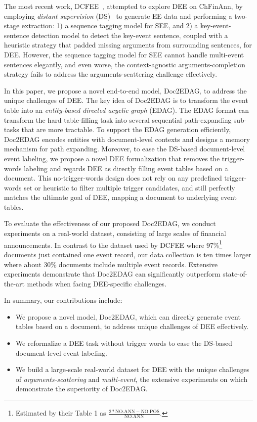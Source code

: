 \documentclass[11pt,a4paper]{article}
\begin{document}
The most recent work, DCFEE~\cite{yang2018dcfee}, attempted to explore DEE on ChFinAnn, by employing \textit{distant supervision} (DS)~\cite{mintz2009distant} to generate EE data and performing a two-stage extraction: 1) a sequence tagging model for SEE, and 2) a key-event-sentence detection model to detect the key-event sentence, coupled with a heuristic strategy that padded missing arguments from surrounding sentences, for DEE.
However, the sequence tagging model for SEE cannot handle multi-event sentences elegantly, and even worse, the context-agnostic arguments-completion strategy fails to address the arguments-scattering challenge effectively.

In this paper, we propose a novel end-to-end model, Doc2EDAG, to address the unique challenges of DEE.
The key idea of Doc2EDAG is to transform the event table into an \textit{entity-based directed acyclic graph} (EDAG).
The EDAG format can transform the hard table-filling task into several sequential path-expanding sub-tasks that are more tractable.
To support the EDAG generation efficiently, Doc2EDAG encodes entities with document-level contexts and designs a memory mechanism for path expanding.
Moreover, to ease the DS-based document-level event labeling,
we propose a novel DEE formalization that removes the trigger-words labeling and regards DEE as directly filling event tables based on a document.
This no-trigger-words design does not rely on any predefined trigger-words set or heuristic to filter multiple trigger candidates, and still perfectly matches the ultimate goal of DEE, mapping a document to underlying event tables.

To evaluate the effectiveness of our proposed Doc2EDAG, we conduct experiments on a real-world dataset, consisting of large scales of financial announcements. In contrast to the dataset used by DCFEE where
97\%\footnote{Estimated by their Table 1 as $\frac{2*\text{NO.ANN}-\text{NO.POS}}{\text{NO.ANN}}$.}
documents just contained one event record,
our data collection is ten times larger where about 30\% documents include multiple event records. 
Extensive experiments demonstrate that Doc2EDAG can significantly outperform state-of-the-art methods when facing DEE-specific challenges.


In summary, our contributions include:
\begin{itemize}
    \item We propose a novel model, Doc2EDAG, which can directly generate event tables based on a document, to address unique challenges of DEE effectively.
    \item We reformalize a DEE task without trigger words to ease the DS-based document-level event labeling.
    \item We build a large-scale real-world dataset for DEE with the unique challenges of \textit{arguments-scattering} and \textit{multi-event}, the extensive experiments on which demonstrate the superiority of Doc2EDAG.
\end{itemize}
\end{document}
